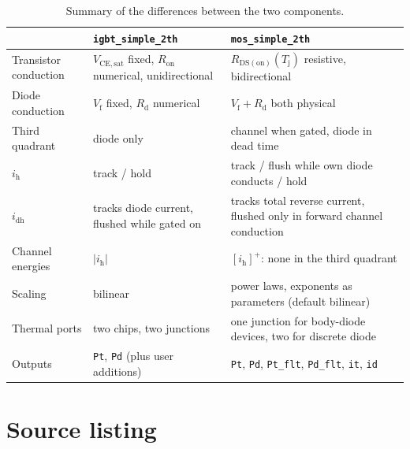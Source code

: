\documentclass[11pt,a4paper]{article}
\newcommand{\Rdson}{R_{\mathrm{DS(on)}}}
\newcommand{\Tj}{T_{\mathrm{j}}}
\newcommand{\ih}{i_{\mathrm{h}}}
\newcommand{\idh}{i_{\mathrm{dh}}}
\newcommand{\code}[1]{\texttt{#1}}
\begin{document}
\begin{table}[htbp]
\centering
\caption{Summary of the differences between the two components.}
\label{tab:diff}
\small
\begin{tabularx}{\textwidth}{@{}lXX@{}}
\toprule
 & \code{igbt\_simple\_2th} & \code{mos\_simple\_2th} \\
\midrule
Transistor conduction & $V_\mathrm{CE,sat}$ fixed, $R_\mathrm{on}$ numerical, unidirectional & $\Rdson(\Tj)$ resistive, bidirectional \\
Diode conduction & $V_\mathrm{f}$ fixed, $R_\mathrm{d}$ numerical & $V_\mathrm{f} + R_\mathrm{d}$ both physical \\
Third quadrant & diode only & channel when gated, diode in dead time \\
$\ih$ & track / hold & track / flush while own diode conducts / hold \\
$\idh$ & tracks diode current, flushed while gated on & tracks total reverse current, flushed only in forward channel conduction \\
Channel energies & $|\ih|$ & $[\ih]^+$: none in the third quadrant \\
Scaling & bilinear & power laws, exponents as parameters (default bilinear) \\
Thermal ports & two chips, two junctions & one junction for body-diode devices, two for discrete diode \\
Outputs & \code{Pt}, \code{Pd} (plus user additions) & \code{Pt}, \code{Pd}, \code{Pt\_flt}, \code{Pd\_flt}, \code{it}, \code{id} \\
\bottomrule
\end{tabularx}
\end{table}

\appendix
\section{Source listing}


\end{document}
